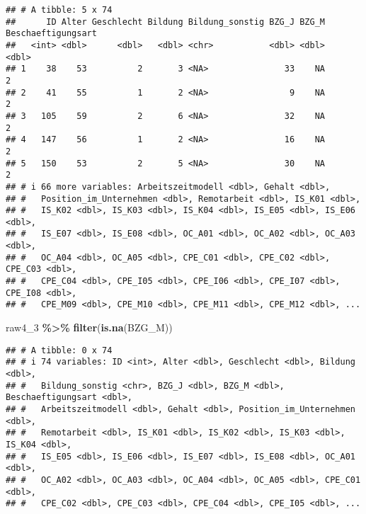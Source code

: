 \documentclass[
]{article}
\newenvironment{Shaded}{\begin{snugshade}}{\end{snugshade}}
\newcommand{\DecValTok}[1]{\textcolor[rgb]{0.00,0.00,0.81}{#1}}
\newcommand{\FunctionTok}[1]{\textcolor[rgb]{0.13,0.29,0.53}{\textbf{#1}}}
\newcommand{\NormalTok}[1]{#1}
\newcommand{\OtherTok}[1]{\textcolor[rgb]{0.56,0.35,0.01}{#1}}
\newcommand{\SpecialCharTok}[1]{\textcolor[rgb]{0.81,0.36,0.00}{\textbf{#1}}}
\begin{document}
\begin{verbatim}
## # A tibble: 5 x 74
##      ID Alter Geschlecht Bildung Bildung_sonstig BZG_J BZG_M Beschaeftigungsart
##   <int> <dbl>      <dbl>   <dbl> <chr>           <dbl> <dbl>              <dbl>
## 1    38    53          2       3 <NA>               33    NA                  2
## 2    41    55          1       2 <NA>                9    NA                  2
## 3   105    59          2       6 <NA>               32    NA                  2
## 4   147    56          1       2 <NA>               16    NA                  2
## 5   150    53          2       5 <NA>               30    NA                  2
## # i 66 more variables: Arbeitszeitmodell <dbl>, Gehalt <dbl>,
## #   Position_im_Unternehmen <dbl>, Remotarbeit <dbl>, IS_K01 <dbl>,
## #   IS_K02 <dbl>, IS_K03 <dbl>, IS_K04 <dbl>, IS_E05 <dbl>, IS_E06 <dbl>,
## #   IS_E07 <dbl>, IS_E08 <dbl>, OC_A01 <dbl>, OC_A02 <dbl>, OC_A03 <dbl>,
## #   OC_A04 <dbl>, OC_A05 <dbl>, CPE_C01 <dbl>, CPE_C02 <dbl>, CPE_C03 <dbl>,
## #   CPE_C04 <dbl>, CPE_I05 <dbl>, CPE_I06 <dbl>, CPE_I07 <dbl>, CPE_I08 <dbl>,
## #   CPE_M09 <dbl>, CPE_M10 <dbl>, CPE_M11 <dbl>, CPE_M12 <dbl>, ...
\end{verbatim}

\begin{Shaded}
\end{Shaded}

\begin{Shaded}
\begin{Highlighting}[]
\NormalTok{raw4\_3 }\SpecialCharTok{\%\textgreater{}\%} 
  \FunctionTok{filter}\NormalTok{(}\FunctionTok{is.na}\NormalTok{(BZG\_M))}
\end{Highlighting}
\end{Shaded}

\begin{verbatim}
## # A tibble: 0 x 74
## # i 74 variables: ID <int>, Alter <dbl>, Geschlecht <dbl>, Bildung <dbl>,
## #   Bildung_sonstig <chr>, BZG_J <dbl>, BZG_M <dbl>, Beschaeftigungsart <dbl>,
## #   Arbeitszeitmodell <dbl>, Gehalt <dbl>, Position_im_Unternehmen <dbl>,
## #   Remotarbeit <dbl>, IS_K01 <dbl>, IS_K02 <dbl>, IS_K03 <dbl>, IS_K04 <dbl>,
## #   IS_E05 <dbl>, IS_E06 <dbl>, IS_E07 <dbl>, IS_E08 <dbl>, OC_A01 <dbl>,
## #   OC_A02 <dbl>, OC_A03 <dbl>, OC_A04 <dbl>, OC_A05 <dbl>, CPE_C01 <dbl>,
## #   CPE_C02 <dbl>, CPE_C03 <dbl>, CPE_C04 <dbl>, CPE_I05 <dbl>, ...
\end{verbatim}
\end{document}
